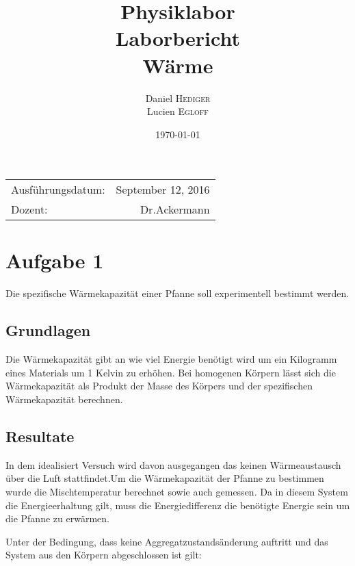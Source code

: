 \documentclass{article}
\title{Physiklabor \\ Laborbericht \\ Wärme} %
\author{Daniel \textsc{Hediger} \\ Lucien \textsc{Egloff}} %
\date{\today} %
\begin{document}
\maketitle %

\begin{center}
\begin{tabular}{l r}
Ausführungsdatum: & September 12, 2016 \\ %
Dozent: & Dr.Ackermann %
\end{tabular}
\end{center}
\newpage
\tableofcontents 

\newpage
\section{Aufgabe 1}
Die spezifische Wärmekapazität einer Pfanne soll experimentell bestimmt werden.
\subsection{Grundlagen}
Die Wärmekapazität gibt an wie viel Energie benötigt wird um ein Kilogramm eines Materials um 1 Kelvin zu erhöhen.
Bei homogenen Körpern lässt sich die Wärmekapazität als Produkt der Masse des Körpers und der spezifischen Wärmekapazität berechnen.
\subsection{Resultate}
In dem idealisiert Versuch wird davon ausgegangen das keinen Wärmeaustausch über die Luft stattfindet.Um die Wärmekapazität der Pfanne zu bestimmen wurde die Mischtemperatur berechnet sowie auch gemessen. Da in diesem System die Energieerhaltung gilt, muss die Energiedifferenz die benötigte Energie sein um die Pfanne zu erwärmen.

Unter der Bedingung, dass keine Aggregatzustandsänderung auftritt und das System aus den Körpern abgeschlossen ist gilt:
\end{document}
